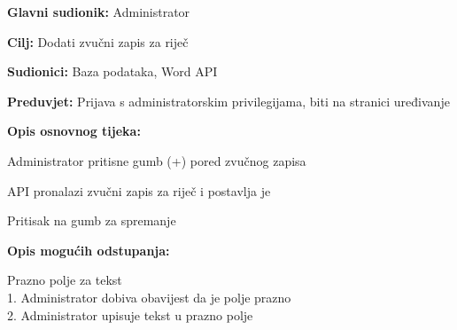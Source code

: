 					
					\noindent {}
					\begin{packed_item}
						\item \textbf{Glavni sudionik:} Administrator
						\item \textbf{Cilj:} Dodati zvučni zapis za riječ
						\item \textbf{Sudionici:} Baza podataka, Word API
						\item \textbf{Preduvjet:} Prijava s administratorskim privilegijama, biti na stranici uređivanje
						\item \textbf{Opis osnovnog tijeka:}
						\begin{packed_enum}
							\item Administrator pritisne gumb (+) pored zvučnog zapisa
							\item API pronalazi zvučni zapis za riječ i postavlja je
							\item Pritisak na gumb za spremanje
						\end{packed_enum}
						\item \textbf{Opis mogućih odstupanja:}
						\begin{packed_item}
							\item [1.a] Prazno polje za tekst
							\\1. Administrator dobiva obavijest da je polje prazno
							\\2. Administrator upisuje tekst u prazno polje
						\end{packed_item}
					\end{packed_item}
					
